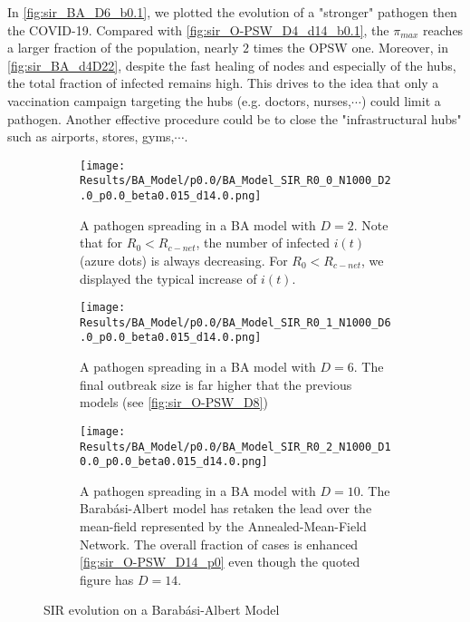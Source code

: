 \documentclass[a4paper,10pt]{book} %
\theoremstyle{definition}
\begin{document}
In \autoref{fig:sir_BA_D6_b0.1}, we plotted the evolution of a "stronger" pathogen then the COVID-19.
Compared with \autoref{fig:sir_O-PSW_D4_d14_b0.1}, the $ \pi_{max} $ reaches a larger fraction of the population, nearly $ 2$ times the OPSW one.
Moreover, in \autoref{fig:sir_BA_d4D22}, despite the fast healing of nodes and especially of the hubs, the total fraction of infected remains high. This drives to the idea that only a vaccination campaign targeting the hubs (e.g. doctors, nurses,$\cdots$) could limit a pathogen. Another effective procedure could be to close the "infrastructural hubs" such as airports, stores, gyms,$ \cdots $.

\begin{figure}[p]
	\begin{subfigure}{.9\linewidth}
		\texttt{[image: Results/BA\_Model/p0.0/BA\_Model\_SIR\_R0\_0\_N1000\_D2.0\_p0.0\_beta0.015\_d14.0.png]}
		\caption{A pathogen spreading in a BA model with $D = 2$. Note that for $ R_0 < R_{c-net} $, the number of infected $ i(t)$ (azure dots) is always decreasing. For $ R_0 < R_{c-net} $, we displayed the typical increase of $ i(t)$.}
		\label{fig:sir_BA_D2}
	\end{subfigure}
	\vspace{.5cm}
	\begin{subfigure}{.9\linewidth}
		\texttt{[image: Results/BA\_Model/p0.0/BA\_Model\_SIR\_R0\_1\_N1000\_D6.0\_p0.0\_beta0.015\_d14.0.png]}
		\caption{A pathogen spreading in a BA model with $D = 6$. The final outbreak size is far higher that the previous models (see \autoref{fig:sir_O-PSW_D8})}
		\label{fig:sir_BA_D6}
	\end{subfigure}
	\vfill
	\begin{subfigure}{.9\linewidth}
		\texttt{[image: Results/BA\_Model/p0.0/BA\_Model\_SIR\_R0\_2\_N1000\_D10.0\_p0.0\_beta0.015\_d14.0.png]}
		\caption{A pathogen spreading in a BA model with $D = 10$. The Barabási-Albert model has retaken the lead over the mean-field represented by the Annealed-Mean-Field Network. The overall fraction of cases is enhanced \autoref{fig:sir_O-PSW_D14_p0} even though the quoted figure has $ D = 14$.}
		\label{fig:sir_BA_D10}
	\end{subfigure}
	\caption{SIR evolution on a Barabási-Albert Model}
	\label{fig:sir_BA_COVID}
\end{figure}

\clearpage
\end{document}
